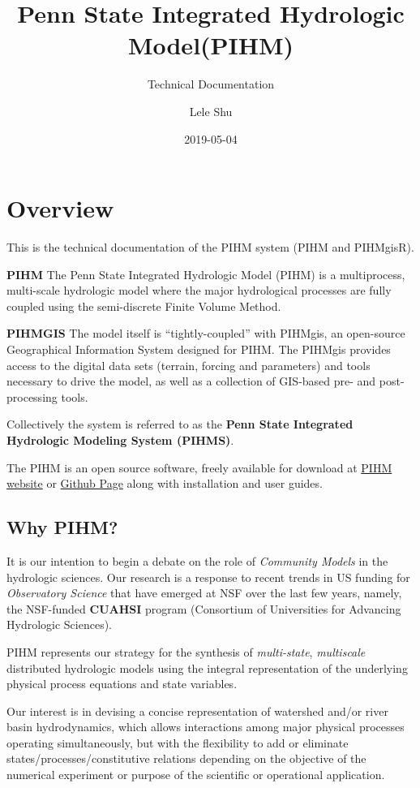 \documentclass[]{scrbook}
\title{Penn State Integrated Hydrologic Model(PIHM)}
\subtitle{Technical Documentation}
\author{Lele Shu}
\date{2019-05-04}
\begin{document}
\maketitle

{
\setcounter{tocdepth}{1}
\tableofcontents
}
\chapter{Overview}\label{Overview}

This is the technical documentation of the PIHM system (PIHM and
PIHMgisR).

\textbf{PIHM} The Penn State Integrated Hydrologic Model (PIHM) is a
multiprocess, multi-scale hydrologic model where the major hydrological
processes are fully coupled using the semi-discrete Finite Volume
Method.

\textbf{PIHMGIS} The model itself is ``tightly-coupled'' with PIHMgis,
an open-source Geographical Information System designed for PIHM. The
PIHMgis provides access to the digital data sets (terrain, forcing and
parameters) and tools necessary to drive the model, as well as a
collection of GIS-based pre- and post-processing tools.

Collectively the system is referred to as the \textbf{Penn State
Integrated Hydrologic Modeling System (PIHMS)}.

The PIHM is an open source software, freely available for download at
\href{www.pihm.psu.edu}{PIHM website} or
\href{https://github.com/shulele/PIHM++}{Github Page} along with
installation and user guides.

\section{Why PIHM?}\label{why-pihm}

It is our intention to begin a debate on the role of \emph{Community
Models} in the hydrologic sciences. Our research is a response to recent
trends in US funding for \emph{Observatory Science} that have emerged at
NSF over the last few years, namely, the NSF-funded \textbf{CUAHSI}
program (Consortium of Universities for Advancing Hydrologic Sciences).

PIHM represents our strategy for the synthesis of \emph{multi-state},
\emph{multiscale} distributed hydrologic models using the integral
representation of the underlying physical process equations and state
variables.

Our interest is in devising a concise representation of watershed and/or
river basin hydrodynamics, which allows interactions among major
physical processes operating simultaneously, but with the flexibility to
add or eliminate states/processes/constitutive relations depending on
the objective of the numerical experiment or purpose of the scientific
or operational application.
\end{document}
